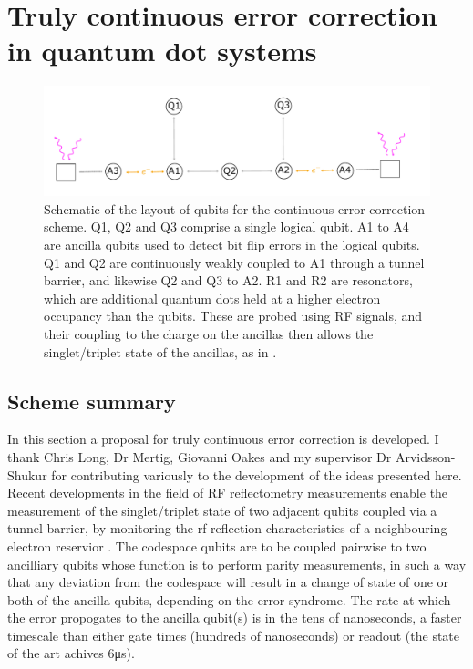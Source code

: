 \documentclass{report}
\begin{document}
\section{Truly continuous error correction in quantum dot systems} \label{sec:truly_continuous_theory}
\begin{figure}[ht]
    \centering
    \includegraphics[scale = 0.9]{Figures/7q.pdf}
    \caption{Schematic of the layout of qubits for the continuous error correction scheme. Q1, Q2 and Q3 comprise a single logical qubit. A1 to A4 are ancilla qubits used to detect bit flip errors in the logical qubits. Q1 and Q2 are continuously weakly coupled to A1 through a tunnel barrier, and likewise Q2 and Q3 to A2. R1 and R2 are resonators, which are additional quantum dots held at a higher electron occupancy than the qubits. These are probed using RF signals, and their coupling to the charge on the ancillas then allows the singlet/triplet state of the ancillas, as in \cite{Oakes2022}.}
    \label{fig:7qubitlayout}
\end{figure}
\subsection{Scheme summary}

In this section a proposal for truly continuous error correction is developed. I thank Chris Long, Dr Mertig, Giovanni Oakes and my supervisor Dr Arvidsson-Shukur for contributing variously to the development of the ideas presented here. Recent developments in the field of RF reflectometry measurements enable the measurement of the singlet/triplet state of two adjacent qubits coupled via a tunnel barrier, by monitoring the rf reflection characteristics of a neighbouring electron reservior \cite{Oakes2022}. The codespace qubits are to be coupled pairwise to two ancilliary qubits whose function is to perform parity measurements, in such a way that any deviation from the codespace will result in a change of state of one or both of the ancilla qubits, depending on the error syndrome. The rate at which the error propogates to the ancilla qubit(s) is in the tens of nanoseconds, a faster timescale than either gate times (hundreds of nanoseconds) or readout (the state of the art \cite{Oakes2022} achives 6\unit{\micro\second}). 
\end{document}
